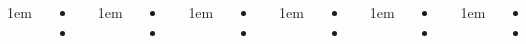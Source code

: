 \documentclass[	20pt, 
							a1paper, 
							portrait, %
							margin=0mm, %
							innermargin=10mm,  		%
							colspace=5mm, 
							subcolspace=0mm
							]{tikzposter}
\begin{document}
\begin{columns}
			{
					\setlength{\leftmargini}{4em}
					\setlength{\labelsep} {1em}
					\begin{itemize}
					\item 
					\item 
					\end{itemize}
			}

			{
					\setlength{\leftmargini}{4em}
					\setlength{\labelsep} {1em}
					\begin{itemize}
					\item 
					\item 
					\end{itemize}
			}






			{
					\setlength{\leftmargini}{4em}
					\setlength{\labelsep} {1em}
					\begin{itemize}
					\item 
					\item 
					\end{itemize}
			}



			{
					\setlength{\leftmargini}{4em}
					\setlength{\labelsep} {1em}
					\begin{itemize}
					\item 
					\item 
					\end{itemize}
			}


			{
					\setlength{\leftmargini}{4em}
					\setlength{\labelsep} {1em}
					\begin{itemize}
					\item 
					\item 
					\end{itemize}
			} %


			{
					\setlength{\leftmargini}{4em}
					\setlength{\labelsep} {1em}
					\begin{itemize}
					\item 
					\item 
					\end{itemize}
			} %



\end{columns}
\end{document}
